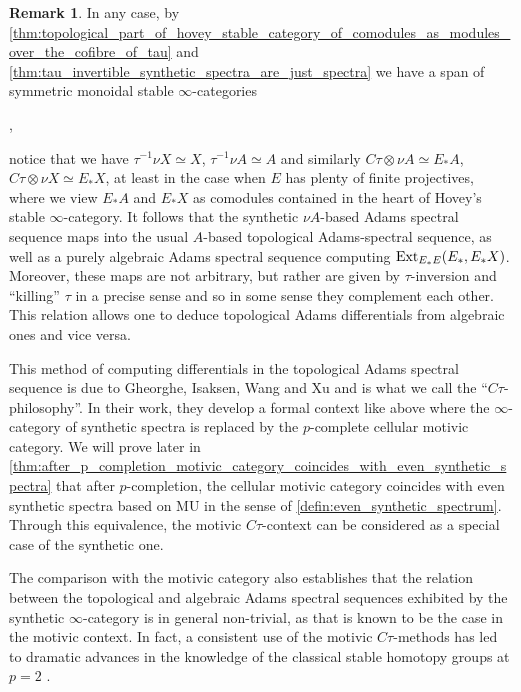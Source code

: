 \documentclass[oneside,a4paper]{amsart}
\newcommand{\euscr}[1]{\EuScript{#1}} %
\newcommand{\Ext}{\textnormal{Ext}} %
\newcommand{\MU}{\mathrm{MU}} %
\newcommand{\spectra}{\euscr{S}p} %
\newcommand{\stableE}{\euscr{S}table_{E_{*}E}} %
\newcommand{\synspectra}{\euscr{S}yn} %
\theoremstyle{plain}
\theoremstyle{definition}
\newtheorem{rem}[thm]{Remark}
\theoremstyle{remark}
\begin{document}
\begin{rem}
In any case, by \cref{thm:topological_part_of_hovey_stable_category_of_comodules_as_modules_over_the_cofibre_of_tau} and \cref{thm:tau_invertible_synthetic_spectra_are_just_spectra} we have a span of symmetric monoidal stable $\infty$-categories 

\begin{center}
	,
\end{center}
notice that we have $\tau^{-1} \nu X \simeq X$, $\tau^{-1} \nu A \simeq A$ and similarly $C\tau \otimes \nu A \simeq E_{*}A$, $C\tau \otimes \nu X \simeq E_{*}X$, at least in the case when $E$ has plenty of finite projectives, where we view $E_{*}A$ and $E_{*}X$ as comodules contained in the heart of Hovey's stable $\infty$-category. It follows that the synthetic $\nu A$-based Adams spectral sequence maps into the usual $A$-based topological Adams-spectral sequence, as well as a purely algebraic Adams spectral sequence computing $\Ext_{E_{*}E}(E_{*}, E_{*}X)$. Moreover, these maps are not arbitrary, but rather are given by $\tau$-inversion and ``killing'' $\tau$ in a precise sense and so in some sense they complement each other. This relation allows one to deduce topological Adams differentials from algebraic ones and vice versa. 

This method of computing differentials in the topological Adams spectral sequence is due to Gheorghe, Isaksen, Wang and Xu and is what we call the ``$C\tau$-philosophy''. In their work, they develop a formal context like above where the $\infty$-category of synthetic spectra is replaced by the $p$-complete cellular motivic category. We will prove later in \cref{thm:after_p_completion_motivic_category_coincides_with_even_synthetic_spectra} that after $p$-completion, the cellular motivic category coincides with even synthetic spectra based on $\MU$ in the sense of \cref{defin:even_synthetic_spectrum}. Through this equivalence, the motivic $C\tau$-context can be considered as a special case of the synthetic one. 

The comparison with the motivic category also establishes that the relation between the topological and algebraic Adams spectral sequences exhibited by the synthetic $\infty$-category is in general non-trivial, as that is known to be the case in the motivic context. In fact, a consistent use of the motivic $C\tau$-methods has led to dramatic advances in the knowledge of the classical stable homotopy groups at $p = 2$ \cite{isaksen_stable_stems, more_stable_stems}. 
\end{rem}
\end{document}
